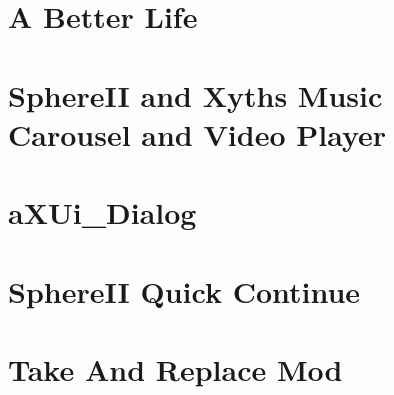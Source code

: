 \let\mypdfximage\pdfximage\def\pdfximage{\immediate\mypdfximage}\documentclass[twoside]{book}
\newcommand{\+}{\discretionary{\mbox{\scriptsize$\hookleftarrow$}}{}{}}
\begin{document}
\chapter{A Better Life}
\label{md__c_1__users_jkilpatrick__documents__git_hub__sphere_i_i_8_mods__sphere_i_i__a__better__life__r_e_a_d_m_e}

\chapter{Sphere\+II and Xyth\textquotesingle{}s Music Carousel and Video Player}
\label{md__c_1__users_jkilpatrick__documents__git_hub__sphere_i_i_8_mods__sphere_i_i__music__boxes__r_e_a_d_m_e}

\chapter{a\+X\+Ui\+\_\+\+Dialog}
\label{md__c_1__users_jkilpatrick__documents__git_hub__sphere_i_i_8_mods__sphere_i_i__n_p_c__dialog__windows__read_me}

\chapter{Sphere\+II Quick Continue}
\label{md__c_1__users_jkilpatrick__documents__git_hub__sphere_i_i_8_mods__sphere_i_i__quick__continue__r_e_a_d_m_e}

\chapter{Take And Replace Mod}
\label{md__c_1__users_jkilpatrick__documents__git_hub__sphere_i_i_8_mods__sphere_i_i__take__and__replace__r_e_a_d_m_e}

\end{document}
